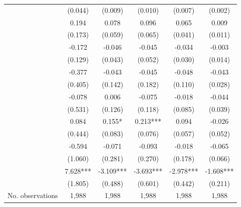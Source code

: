 \begin{table}
\begin{threeparttable}
\begin{tabular}{p{3cm}S@{}S@{}S@{}S@{}S@{}}
                                          &     (0.044)   &     (0.009)   &     (0.010)   &     (0.007)   &     (0.002)   \\
                       &       0.194   &       0.078   &       0.096   &       0.065   &       0.009   \\
                                          &     (0.173)   &     (0.059)   &     (0.065)   &     (0.041)   &     (0.011)   \\
            &      -0.172   &      -0.046   &      -0.045   &      -0.034   &      -0.003   \\
                                          &     (0.129)   &     (0.043)   &     (0.052)   &     (0.030)   &     (0.014)   \\
                &      -0.377   &      -0.043   &      -0.045   &      -0.048   &      -0.043   \\
                                          &     (0.405)   &     (0.142)   &     (0.182)   &     (0.110)   &     (0.028)   \\
                        &      -0.078   &       0.006   &      -0.075   &      -0.018   &      -0.044   \\
                                          &     (0.531)   &     (0.126)   &     (0.118)   &     (0.085)   &     (0.039)   \\
                     &       0.084   &       0.155*  &       0.213***&       0.094   &      -0.026   \\
                                          &     (0.444)   &     (0.083)   &     (0.076)   &     (0.057)   &     (0.052)   \\
                         &      -0.594   &      -0.071   &      -0.093   &      -0.018   &      -0.065   \\
                                          &     (1.060)   &     (0.281)   &     (0.270)   &     (0.178)   &     (0.066)   \\
                      &       7.628***&      -3.109***&      -3.693***&      -2.978***&      -1.608***\\
                                          &     (1.805)   &     (0.488)   &     (0.601)   &     (0.442)   &     (0.211)   \\
            \midrule
            No. observations              &       1,988   &       1,988   &       1,988   &       1,988   &       1,988   \\

\end{tabular}
\end{threeparttable}
\end{table}
